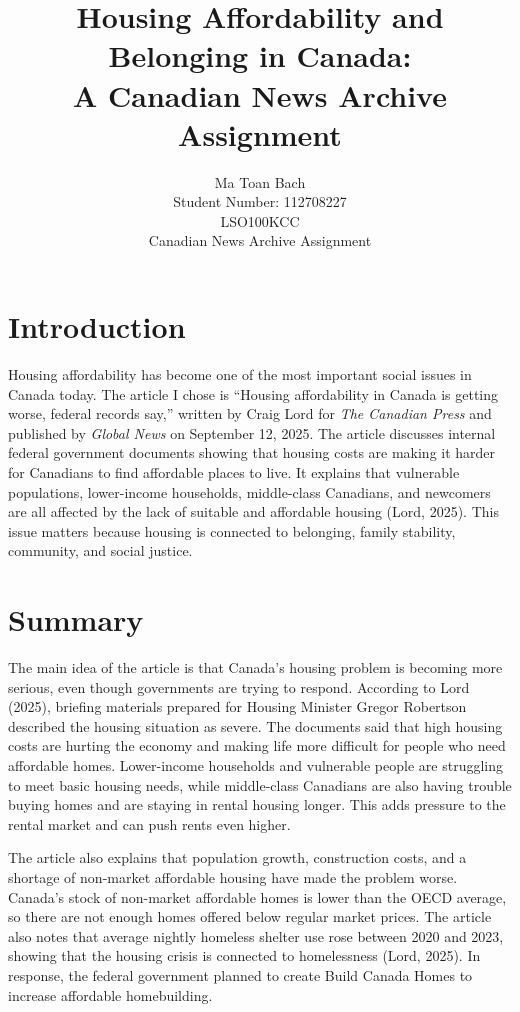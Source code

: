 \documentclass[12pt]{article}
\title{Housing Affordability and Belonging in Canada:\\
A Canadian News Archive Assignment}
\author{%
  Ma Toan Bach\\
  Student Number: 112708227\\
  LSO100KCC\\
  Canadian News Archive Assignment
}
\date{}
\begin{document}
\maketitle

\section*{Introduction}

Housing affordability has become one of the most important social issues in Canada today. The article I chose is ``Housing affordability in Canada is getting worse, federal records say,'' written by Craig Lord for \textit{The Canadian Press} and published by \textit{Global News} on September 12, 2025. The article discusses internal federal government documents showing that housing costs are making it harder for Canadians to find affordable places to live. It explains that vulnerable populations, lower-income households, middle-class Canadians, and newcomers are all affected by the lack of suitable and affordable housing (Lord, 2025). This issue matters because housing is connected to belonging, family stability, community, and social justice.

\section*{Summary}

The main idea of the article is that Canada's housing problem is becoming more serious, even though governments are trying to respond. According to Lord (2025), briefing materials prepared for Housing Minister Gregor Robertson described the housing situation as severe. The documents said that high housing costs are hurting the economy and making life more difficult for people who need affordable homes. Lower-income households and vulnerable people are struggling to meet basic housing needs, while middle-class Canadians are also having trouble buying homes and are staying in rental housing longer. This adds pressure to the rental market and can push rents even higher.

The article also explains that population growth, construction costs, and a shortage of non-market affordable housing have made the problem worse. Canada's stock of non-market affordable homes is lower than the OECD average, so there are not enough homes offered below regular market prices. The article also notes that average nightly homeless shelter use rose between 2020 and 2023, showing that the housing crisis is connected to homelessness (Lord, 2025). In response, the federal government planned to create Build Canada Homes to increase affordable homebuilding.
\end{document}
